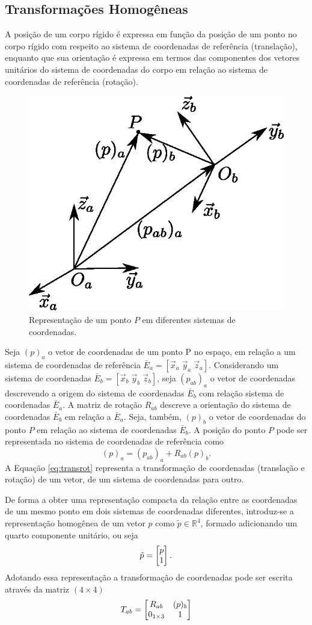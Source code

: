 \subsection{Transformações Homogêneas}
A posição de um corpo rígido é expressa em função da posição de um ponto no corpo rígido com respeito ao sistema de coordenadas de referência (translação),
 enquanto que sua orientação é expressa em termos das componentes dos vetores unitários do sistema de coordenadas do corpo em relação ao sistema de coordenadas de referência (rotação).


\begin{figure}[!h]
  \centering
  \includegraphics[width=0.4\linewidth]{./img/homogeneous_transform}
  \caption{Representação de um ponto $P$ em diferentes sistemas de coordenadas.}
  \label{fig:homogeneous_transform}
\end{figure}


Seja $(p)_a$ o vetor de coordenadas de um ponto P no espaço, em relação a um sistema de coordenadas de referência $\bar{E}_a = [\vec{x}_a \; \vec{y}_a \; \vec{z}_a ]$. 
Considerando um sistema de coordenadas  $\bar{E}_b = [\vec{x}_b \; \vec{y}_b \; \vec{z}_b]$, seja $(p_{ab})_a$ o vetor de coordenadas descrevendo a origem do sistema de coordenadas $\bar{E}_b$ com relação sistema de coordenadas  $\bar{E}_a$. A matriz de rotação $R_{ab}$ descreve a orientação do sistema de coordenadas $\bar{E}_b$ em relação a $\bar{E}_a$. Seja, também, $(p)_b$ o vetor de coordenadas do ponto $P$ em relação ao sistema de coordenadas $\bar{E}_b$.  A posição do ponto $P$ pode ser representada no sistema de coordenadas de referência como
\begin{equation} \label{eq:transrot}
(p)_a = (p_{ab})_a + R_{ab} (p)_b.
\end{equation}
A Equação \eqref{eq:transrot} representa a transformação de coordenadas (translação e rotação) de um vetor, de um sistema de coordenadas para outro.

De forma a obter uma representação compacta da relação entre as coordenadas de um mesmo ponto em dois sistemas de coordenadas diferentes, introduz-se a representação homogênea de um vetor $p$ como $\tilde{p} \in \mathbb{R}^4$, formado adicionando um quarto componente unitário, ou seja
\begin{equation}
\tilde{p} = \begin{bmatrix}p \\ 1\end{bmatrix}.
\end{equation}  
Adotando essa representação a transformação de coordenadas pode ser escrita através da matriz $(4 \times 4) $
\begin{equation}
T_{ab} = \begin{bmatrix}
    R_{ab} & (p)_b \\
    0_{1 \times 3} & 1
\end{bmatrix}
\end{equation}

